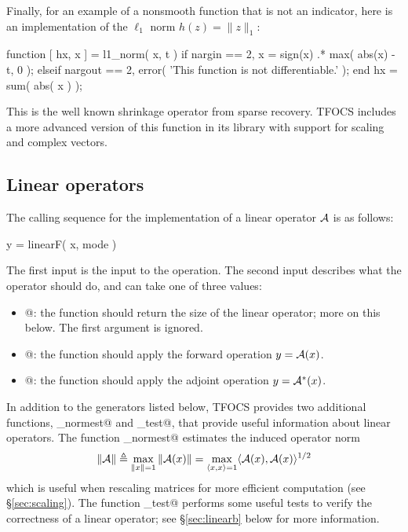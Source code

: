 \documentclass{article}
\begin{document}
Finally, for an example of a nonsmooth function that is not
an indicator, here is an implementation of the $\ell_1$ norm 
$h(z)=\|z\|_1$:
\begin{code}
	function [ hx, x ] = l1_norm( x, t )
	if nargin == 2,
	    x  = sign(x) .* max( abs(x) - t, 0 );
	elseif nargout == 2,
	    error( 'This function is not differentiable.' );
	end		
	hx = sum( abs( x ) );
\end{code}
This is the well known shrinkage operator from sparse recovery.
TFOCS includes a more advanced version of this function in its
library with support for scaling and complex vectors. 

\subsection{Linear operators}
\label{sec:linear}

The calling sequence for the implementation \verb@linearF@ of a linear operator $\mathcal{A}$ is as follows:
\begin{code}
	y = linearF( x, mode )
\end{code}
The first input \verb@x@ is the input to the operation. The 
second input \verb@mode@ describes what the operator should do,
and can take one of three values:
\begin{itemize}
\item {}@: the function should return the size of
the linear operator; more on this below. The first argument \verb@x@ is ignored.
\item {}@: the function should apply the forward operation $y=\mathcal{A}(x)$.
\item {}@: the function should apply the adjoint operation $y=\mathcal{A}^*(x)$.
\end{itemize}

In addition to the generators listed below, TFOCS provides two additional
functions, \verb@linop_normest@ and \verb@linop_test@, that provide useful
information about linear operators.
The function \verb@linop_normest@ estimates the induced operator norm 
\begin{equation}
	\| \mathcal{A} \| \triangleq \max_{\|x\|=1} \|\mathcal{A}(x)\| = \max_{\langle x,x\rangle=1} \langle \mathcal{A}(x),\mathcal{A}(x)\rangle^{1/2}
\end{equation}
which is useful when rescaling matrices for more efficient computation (see
\S\ref{sec:scaling}). The function \verb@linop_test@ performs some useful
tests to verify the correctness of a linear operator; see \S\ref{sec:linearb}
below for more information.
\end{document}
